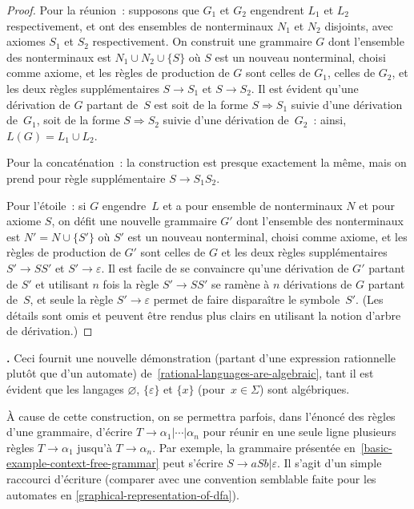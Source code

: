 \documentclass[12pt,a4paper]{article}
\theoremstyle{definition}
\newcommand\thingy{%
\refstepcounter{comcnt}\medskip\noindent\textbf{\thecomcnt.} }
\begin{document}
\begin{proof}
Pour la réunion : supposons que $G_1$ et $G_2$ engendrent $L_1$ et
$L_2$ respectivement, et ont des ensembles de nonterminaux $N_1$ et
$N_2$ disjoints, avec axiomes $S_1$ et $S_2$ respectivement.  On
construit une grammaire $G$ dont l'ensemble des nonterminaux est $N_1
\cup N_2 \cup \{S\}$ où $S$ est un nouveau nonterminal, choisi comme
axiome, et les règles de production de $G$ sont celles de $G_1$,
celles de $G_2$, et les deux règles supplémentaires $S \rightarrow
S_1$ et $S \rightarrow S_2$.  Il est évident qu'une dérivation de $G$
partant de $S$ est soit de la forme $S \Rightarrow S_1$ suivie d'une
dérivation de $G_1$, soit de la forme $S \Rightarrow S_2$ suivie d'une
dérivation de $G_2$ : ainsi, $L(G) = L_1 \cup L_2$.

Pour la concaténation : la construction est presque exactement la
même, mais on prend pour règle supplémentaire $S \rightarrow S_1 S_2$.

Pour l'étoile : si $G$ engendre $L$ et a pour ensemble de nonterminaux
$N$ et pour axiome $S$, on défit une nouvelle grammaire $G'$ dont
l'ensemble des nonterminaux est $N' = N \cup \{S'\}$ où $S'$ est un
nouveau nonterminal, choisi comme axiome, et les règles de production
de $G'$ sont celles de $G$ et les deux règles supplémentaires $S'
\rightarrow SS'$ et $S' \rightarrow \varepsilon$.  Il est facile de se
convaincre qu'une dérivation de $G'$ partant de $S'$ et utilisant $n$
fois la règle $S' \rightarrow SS'$ se ramène à $n$ dérivations de $G$
partant de $S$, et seule la règle $S' \rightarrow \varepsilon$ permet
de faire disparaître le symbole $S'$.  (Les détails sont omis et
peuvent être rendus plus clairs en utilisant la notion d'arbre de
dérivation.)
\end{proof}

\thingy Ceci fournit une nouvelle démonstration (partant d'une
expression rationnelle plutôt que d'un automate)
de \ref{rational-languages-are-algebraic}, tant il est évident que les
langages $\varnothing$, $\{\varepsilon\}$ et $\{x\}$
(pour $x\in\Sigma$) sont algébriques.

À cause de cette construction, on se permettra parfois, dans l'énoncé
des règles d'une grammaire, d'écrire $T \rightarrow \alpha_1 | \cdots
| \alpha_n$ pour réunir en une seule ligne plusieurs règles $T
\rightarrow \alpha_1$ jusqu'à $T \rightarrow \alpha_n$.  Par exemple,
la grammaire présentée en \ref{basic-example-context-free-grammar}
peut s'écrire $S \rightarrow aSb | \varepsilon$.  Il s'agit d'un
simple raccourci d'écriture (comparer avec une convention semblable
faite pour les automates en \ref{graphical-representation-of-dfa}).
\end{document}
